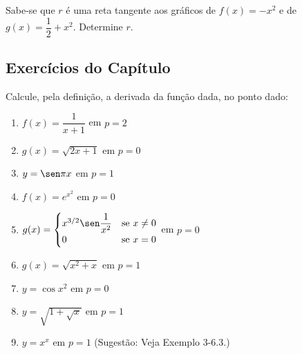 \begin{exercicio}[15]
\label{ex:7.16.15}
Sabe-se que $r$ é uma reta tangente aos gráficos de $f(x) = -x^2$ e de $g(x) = \dfrac{1}{2} + x^2$. Determine $r$.
\end{exercicio}

\clearpage

\subsection{Exercícios do Capítulo}

\begin{exercicio}[1]
\label{ex:7.17.1}
Calcule, pela definição, a derivada da função dada, no ponto dado:
\begin{enumerate}[label=\alph*)]
    \item $f(x) = \dfrac{1}{x + 1}$ em $p = 2$
    \item $g(x) = \sqrt{2x + 1}$ em $p = 0$
    \item $y = \sen \pi x$ em $p = 1$
    \item $f(x) = e^{x^2}$ em $p = 0$
    \item $g(x) = \begin{cases} x^{3/2} \sen \dfrac{1}{x^2} & \text{se } x \neq 0 \\ 0 & \text{se } x = 0 \end{cases}$ em $p = 0$
    \item $g(x) = \sqrt{x^2 + x}$ em $p = 1$
    \item $y = \cos x^2$ em $p = 0$
    \item $y = \sqrt{1 + \sqrt{x}}$ em $p = 1$
    \item $y = x^x$ em $p = 1$ (Sugestão: Veja Exemplo 3-6.3.)
\end{enumerate}
\end{exercicio}

